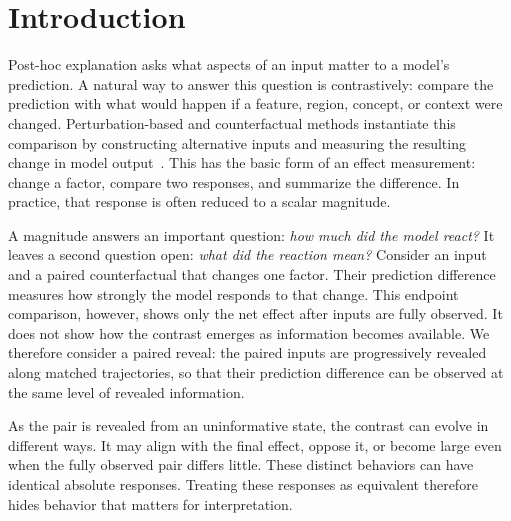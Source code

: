 \section{Introduction}
\label{sec:intro}

Post-hoc explanation asks what aspects of an input matter to a model’s prediction. A natural way to answer this question is contrastively: compare the prediction with what would happen if a feature, region, concept, or context were changed. Perturbation-based and counterfactual methods instantiate this comparison by constructing alternative inputs and measuring the resulting change in model output~\citep{fong2017meaningful,dhurandhar2018explanations,goyal2019counterfactual,covert2021explaining}. This has the basic form of an effect measurement: change a factor, compare two responses, and summarize the difference. In practice, that response is often reduced to a scalar magnitude.

A magnitude answers an important question: \emph{how much did the model react?} It leaves a second question open: \emph{what did the reaction mean?} Consider an input and a paired counterfactual that changes one factor. Their prediction difference measures how strongly the model responds to that change. This endpoint comparison, however, shows only the net effect after inputs are fully observed. It does not show how the contrast emerges as information becomes available. We therefore consider a paired reveal: the paired inputs are progressively revealed along matched trajectories, so that their prediction difference can be observed at the same level of revealed information.

As the pair is revealed from an uninformative state, the contrast can evolve in different ways. It may align with the final effect, oppose it, or become large even when the fully observed pair differs little. These distinct behaviors can have identical absolute responses. Treating these responses as equivalent therefore hides behavior that matters for interpretation.

